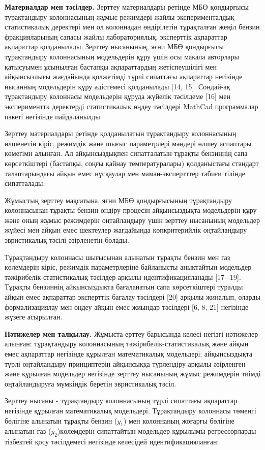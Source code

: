 \begin{multicols}{2}
{\bfseries Материалдар мен тәсілдер.} Зерттеу материалдары ретінде МБӨ
қондырғысы турақтандыру колоннасының жұмыс режимдері жайлы
эксперименталдық-статистикалық деректері мен ол колоннадан өндірілетін
тұрақталған жеңіл бензин фракцияларының сапасы жайлы лабораториялық,
эксперттік ақпараттар ақпараттар қолданылады. Зерттеу нысанының, яғни
МБӨ қондырғысы тұрақтандыру колоннасының модельдерін құру үшін осы
мақала авторлары қатысуымен ұсынылған бастапқы ақпараттардың
жетіспеушілігі мен айқынсызлығы жағдайында қолжетімді түрлі сипаттағы
ақпараттар негізінде нысанның модельдерін құру әдістемесі қолданылады
{[}14, 15{]}. Сондай-ақ тұрақтандыру колоннасы модельдерін құруда
жүйелік тәсілдеме {[}16{]} мен эксперименттк деректерді статистикалық
өңдеу тәсілдері MathCad программалар пакеті негізінде пайдаланылды.

Зерттеу материалдары ретінде қолданылатын тұрақтандыру колоннасының
өлшенетін кіріс, режимдік және шығыс параметрлері мәндері өлшеу
аспаптары көмегімн алынған. Ал айқынсыздықпен сипатталатын тұрақты
бензиннің сапа көрсеткіштері (бастапқы, соңғы қайнау температуралары)
қолданыстағы стандарт талаптарындағы айқын емес нұсқаулар мен
маман-экспертттер табиғи тілінде сипатталады.

Жұмыстың зерттеу мақсатына, яғни МБӨ қондырғысының тұрақтандыру
колоннасынан тұрақты бензин өндіру процесін айқынсыздықта модельдерін
құру және оның жұмыс режимдерін оңтайландыру үшін зерттеу нысанының
модельдер жүйесі мен айқын емес шектеулер жағдайында көпкритерийлік
оңтайландыру эвристикалық тәсілі әзірленетін болады.

Тұрақтандыру колоннасы шығысынан алынатын тұрақты бензин мен газ
көлемдерін кіріс, режимдік параметрлеріне байланысты анықтайтын
модельдер тәжірибелік-статистикалық тәсілдер арқылы идентификацияланады
{[}17−19{]}. Тұрақты бензиннің айқынсыздықта бағаланатын сапа
көрсеткіштері туралды айқын емес ақпараттар эксперттік бағалау тәсілдері
{[}20{]} арқылы жиналып, оларды формализациялау мен өңдеу айқын емес
жиындар тәсілдері {[}6, 8, 21{]} негізінде жүзеге асырылған.

{\bfseries Нәтижелер мен талқылау.} Жұмыста ерттеу барысында
келесі негізгі нәтижелер алынған: тұрақтандыру колоннасының
тәжірибелік-статистикалық және айқын емес ақпараттар негізінде құрылған
математикалық модельдері; айқынсыздықта түрлі оңтайландыру принциптерін
айқынсыққа түрлендіру арқылы әзірленген және құрылған модельдер
негізінде зерттеу нысанының жұмыс режимдерін тиімді оңтайландыруға
мүмкіндік беретін эвристикалық тәсіл.

Зерттеу нысаны - тұрақтандыру колоннасының түрлі сипаттағы ақпараттар
негізінде құрылған математикалық модельдері. Тұрақтандыру
колоннасы төменгі бөлігіне алынатын тұрақты бензин ($y_1$) мен колоннаның жоғарғы бөлігіне
алынатын газ ($y_2 $)көлемдерін сипаттайтын
модельдер құрылымы регрессорларды тізбектей қосу тәсілдемесі негізінде
келесідей идентификацияланған:
\end{multicols}

